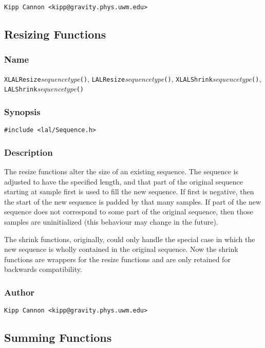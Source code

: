 \verb|Kipp Cannon <kipp@gravity.phys.uwm.edu>|


\subsection{Resizing Functions}

\subsubsection{Name}

\texttt{XLALResize}\textit{sequencetype}\texttt{()},
\texttt{LALResize}\textit{sequencetype}\texttt{()},
\texttt{XLALShrink}\textit{sequencetype}\texttt{()},
\texttt{LALShrink}\textit{sequencetype}\texttt{()}

\subsubsection{Synopsis}

\begin{verbatim}
#include <lal/Sequence.h>
\end{verbatim}


\subsubsection{Description}

The resize functions alter the size of an existing sequence.  The sequence
is adjusted to have the specified length, and that part of the original
sequence starting at sample first is used to fill the new sequence.  If
first is negative, then the start of the new sequence is padded by that
many samples.  If part of the new sequence does not correspond to some part
of the original sequence, then those samples are uninitialized (this
behaviour may change in the future).

The shrink functions, originally, could only handle the special case in
which the new sequence is wholly contained in the original sequence.  Now
the shrink functions are wrappers for the resize functions and are only
retained for backwards compatibility.

\subsubsection{Author}

\verb|Kipp Cannon <kipp@gravity.phys.uwm.edu>|


\subsection{Summing Functions}

